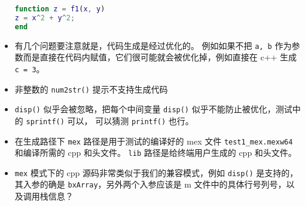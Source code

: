 \begin{itemize}
\begin{lstlisting}[language=matlab,caption=test1.m]
% 子函数
function z = f1(x, y)
z = x^2 + y^2;
end
\end{lstlisting}
\item 有几个问题要注意就是，代码生成是经过优化的。 例如如果不把 \verb`a, b` 作为参数而是直接在代码内赋值，它们很可能就会被优化掉，例如直接在 c++ 生成 \verb`c = 3`。
\item 非整数的 \verb`num2str()` 提示不支持生成代码
\item \verb`disp()` 似乎会被忽略，把每个中间变量 \verb`disp()` 似乎不能防止被优化，测试中的 \verb`sprintf()` 可以， 可以猜测 \verb`printf()` 也行。
\item 在生成路径下 \verb`mex` 路径是用于测试的编译好的 mex 文件 \verb`test1_mex.mexw64` 和编译所需的 cpp 和头文件。 \verb`lib` 路径是给终端用户生成的 cpp 和头文件。
\item \verb`mex` 模式下的 cpp 源码非常类似于我们的兼容模式，例如 \verb`disp()` 是支持的，其入参的确是 \verb`bxArray`，另外两个入参应该是 m 文件中的具体行号列号，以及调用栈信息？ 
\end{itemize}
